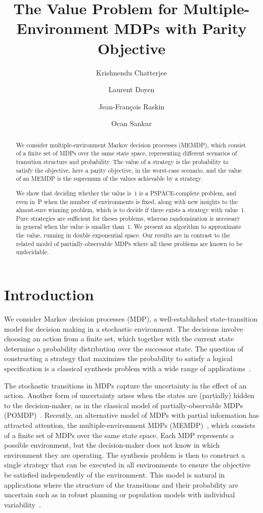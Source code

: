 \documentclass[a4paper,USenglish,cleveref, autoref, thm-restate]{lipics-v2021}
\title{The Value Problem for Multiple-Environment MDPs with Parity Objective}
\author{Krishnendu Chatterjee}{IST Austria}{}{https://orcid.org/0000-0002-4561-241X}{ERC CoG 863818 (ForM-SMArt) and Austrian Science Fund (FWF) 10.55776/COE12;}\author{Laurent Doyen}{CNRS \& LMF, ENS Paris-Saclay, France}{}{https://orcid.org/0000-0003-3714-6145}{}\author{Jean-Fran\c cois Raskin}{Universit\'e Libre de Bruxelles, Belgium}{}{https://orcid.org/0000-0002-3673-1097}{PDR Weave project FORM-LEARN-POMDP funded by FNRS and DFG, and the support of the Fondation ULB;}\author{Ocan Sankur}{Universit\'e de Rennes, CNRS, Inria, France \& Mitsubishi Electric R\&D Centre Europe, France}{}{https://orcid.org/0000-0001-8146-4429}{ANR BisoUS (ANR-22-CE48-0012) and ANR EpiRL (ANR-22-CE23-0029).}\authorrunning{K. Chatterjee \textit{et al.}}
\begin{document}
\maketitle

\begin{abstract}
We consider multiple-environment Markov decision processes (MEMDP), which consist 
of a finite set of MDPs over the same state space, representing different scenarios
of transition structure and probability. 
The value of a strategy is the probability to satisfy the objective, here a parity objective,
in the worst-case scenario, and the value of an MEMDP is the supremum of the values
achievable by a strategy.

We show that deciding  whether the value is~$1$ is a PSPACE-complete problem, 
and even in~P when the number of environments is fixed,
along with new insights to the almost-sure winning problem, which is to decide if there exists 
a strategy with value~$1$. Pure strategies are sufficient for theses problems,
whereas randomization is necessary in general when the value is smaller than~$1$. 
We present an algorithm to approximate the value, running in double exponential space.
Our results are in contrast to the related model of partially-observable MDPs
where all these problems are known to be undecidable.
\end{abstract}


\section{Introduction}\label{sec:intro}


We consider Markov decision processes (MDP), a well-established state-transition model 
for decision making in a stochastic environment. 
The decisions involve choosing an action from a finite set, which
together with the current state determine a probability distribution
over the successor state. The question of constructing a strategy that maximizes
the probability to satisfy a logical specification is a classical 
synthesis problem with a wide range of applications~\cite{Puterman,HBMDP,BK08,BvD17}.

The stochastic transitions in MDPs capture the uncertainty in the effect of
an action. Another form of uncertainty arises when the states are (partially) 
hidden to the decision-maker, as in the classical model of partially-observable
MDPs (POMDP)~\cite{Ast65,PT87}. Recently, an alternative model of MDPs with partial 
information has attracted attention, the multiple-environment MDPs (MEMDP)~\cite{RS14}, 
which consists of a finite set of MDPs over the same state space.
Each MDP represents a possible environment, but the decision-maker
does not know in which environment they are operating. 
The synthesis problem is then to construct a single strategy 
that can be executed in all environments to ensure the objective be satisfied
independently of the environment.
This model is natural in applications where the structure of the transitions and their probability 
are uncertain such as in robust planning or population models with individual variability~\cite{BS19,CCK0R20,BSSJ23,vdVJJ23,SVJ24}.
\end{document}
